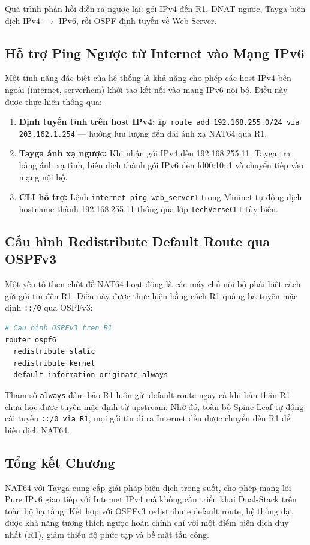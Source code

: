 Quá trình phản hồi diễn ra ngược lại: gói IPv4 đến R1, DNAT ngược, Tayga biên dịch IPv4 $\rightarrow$ IPv6, rồi OSPF định tuyến về Web Server.

\subsection{Hỗ trợ Ping Ngược từ Internet vào Mạng IPv6}

Một tính năng đặc biệt của hệ thống là khả năng cho phép các host IPv4 bên ngoài (internet, serverhcm) khởi tạo kết nối vào mạng IPv6 nội bộ. Điều này được thực hiện thông qua:

\begin{enumerate}
    \item \textbf{Định tuyến tĩnh trên host IPv4:} \texttt{ip route add 192.168.255.0/24 via 203.162.1.254} — hướng lưu lượng đến dải ánh xạ NAT64 qua R1.
    \item \textbf{Tayga ánh xạ ngược:} Khi nhận gói IPv4 đến 192.168.255.11, Tayga tra bảng ánh xạ tĩnh, biên dịch thành gói IPv6 đến fd00:10::1 và chuyển tiếp vào mạng nội bộ.
    \item \textbf{CLI hỗ trợ:} Lệnh \texttt{internet ping web\_server1} trong Mininet tự động dịch hostname thành 192.168.255.11 thông qua lớp \texttt{TechVerseCLI} tùy biến.
\end{enumerate}

\subsection{Cấu hình Redistribute Default Route qua OSPFv3}

Một yếu tố then chốt để NAT64 hoạt động là các máy chủ nội bộ phải biết cách gửi gói tin đến R1. Điều này được thực hiện bằng cách R1 quảng bá tuyến mặc định \texttt{::/0} qua OSPFv3:

\begin{lstlisting}[style=customcode, language=bash, caption={R1 lan tỏa default route xuống toàn bộ Spine-Leaf.}]
# Cau hinh OSPFv3 tren R1
router ospf6
  redistribute static
  redistribute kernel
  default-information originate always
\end{lstlisting}

Tham số \texttt{always} đảm bảo R1 luôn gửi default route ngay cả khi bản thân R1 chưa học được tuyến mặc định từ upstream. Nhờ đó, toàn bộ Spine-Leaf tự động cài tuyến \texttt{::/0 via R1}, mọi gói tin đi ra Internet đều được chuyển đến R1 để biên dịch NAT64.

\subsection{Tổng kết Chương}

NAT64 với Tayga cung cấp giải pháp biên dịch trong suốt, cho phép mạng lõi Pure IPv6 giao tiếp với Internet IPv4 mà không cần triển khai Dual-Stack trên toàn bộ hạ tầng. Kết hợp với OSPFv3 redistribute default route, hệ thống đạt được khả năng tương thích ngược hoàn chỉnh chỉ với một điểm biên dịch duy nhất (R1), giảm thiểu độ phức tạp và bề mặt tấn công.
